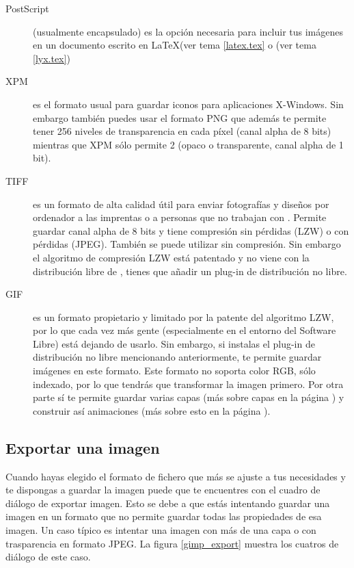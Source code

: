 \begin{description}
\item  [PostScript] (usualmente  encapsulado) es  la opción  necesaria
para incluir tus imágenes en un  documento escrito en \LaTeX (ver tema
\ref{latex.tex} o \LyX (ver tema \ref{lyx.tex})

\item [XPM] es el formato  usual para guardar iconos para aplicaciones
X-Windows.  Sin  embargo  también  puedes  usar  el  formato  PNG  que
además te  permite tener  256 niveles de  transparencia en  cada píxel
(canal  alpha de  8 bits)  mientras que  XPM sólo  permite 2  (opaco o
transparente, canal alpha de 1 bit).

\item  [TIFF]  es  un  formato   de  alta  calidad  útil  para  enviar
fotografías y diseños  por ordenador a las imprentas o  a personas que
no trabajan con  \gimp. Permite guardar canal alpha de  8 bits y tiene
compresión sin pérdidas (LZW) o  con pérdidas (JPEG). También se puede
utilizar sin  compresión. Sin embargo  el algoritmo de  compresión LZW
está patentado y  no viene con la distribución libre  de \gimp, tienes
que añadir un plug-in de distribución no libre.

\item  [GIF] es  un  formato  propietario y  limitado  por la  patente
del  algoritmo LZW,  por  lo  que cada  vez  más gente  (especialmente
en  el  entorno  del  Software  Libre) está  dejando  de  usarlo.  Sin
embargo, si instalas  el plug-in de distribución  no libre mencionando
anteriormente,  te  permite guardar  imágenes  en  este formato.  Este
formato no  soporta color RGB, sólo  indexado, por lo que  tendrás que
transformar la  imagen primero. Por  otra parte sí te  permite guardar
varias  capas  (más sobre  capas  en  la página  \pageref{gimp.capas})
y   construir  así   animaciones  (más   sobre  esto   en  la   página
\pageref{gimp.animaciones.gif}).

\end{description}

\subsection{Exportar una imagen}

Cuando hayas  elegido el formato  de fichero que  más se ajuste  a tus
necesidades y te dispongas a guardar la imagen puede que te encuentres
con el cuadro de diálogo de exportar  imagen. Esto se debe a que estás
intentando guardar  una imagen  en un formato  que no  permite guardar
todas las  propiedades de esa imagen.  Un caso típico es  intentar una
imagen con  más de  una capa  o con trasparencia  en formato  JPEG. La
figura \ref{gimp_export} muestra los cuatros de diálogo de este caso.

